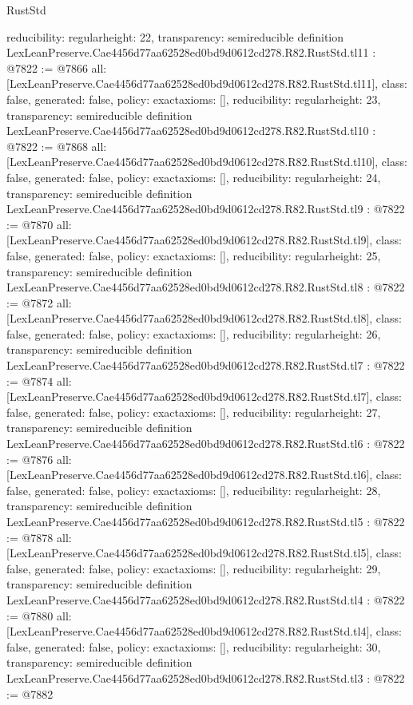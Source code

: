 \begin{lexlean}{RustStd}
\begin{coremodule}
{  reducibility: regular{height: 22},
  transparency: semireducible
}
definition LexLeanPreserve.Cae4456d77aa62528ed0bd9d0612cd278.R82.RustStd.tl11 : @7822 := @7866 {
  all: [LexLeanPreserve.Cae4456d77aa62528ed0bd9d0612cd278.R82.RustStd.tl11],
  class: false,
  generated: false,
  policy: exact{axioms: []},
  reducibility: regular{height: 23},
  transparency: semireducible
}
definition LexLeanPreserve.Cae4456d77aa62528ed0bd9d0612cd278.R82.RustStd.tl10 : @7822 := @7868 {
  all: [LexLeanPreserve.Cae4456d77aa62528ed0bd9d0612cd278.R82.RustStd.tl10],
  class: false,
  generated: false,
  policy: exact{axioms: []},
  reducibility: regular{height: 24},
  transparency: semireducible
}
definition LexLeanPreserve.Cae4456d77aa62528ed0bd9d0612cd278.R82.RustStd.tl9 : @7822 := @7870 {
  all: [LexLeanPreserve.Cae4456d77aa62528ed0bd9d0612cd278.R82.RustStd.tl9],
  class: false,
  generated: false,
  policy: exact{axioms: []},
  reducibility: regular{height: 25},
  transparency: semireducible
}
definition LexLeanPreserve.Cae4456d77aa62528ed0bd9d0612cd278.R82.RustStd.tl8 : @7822 := @7872 {
  all: [LexLeanPreserve.Cae4456d77aa62528ed0bd9d0612cd278.R82.RustStd.tl8],
  class: false,
  generated: false,
  policy: exact{axioms: []},
  reducibility: regular{height: 26},
  transparency: semireducible
}
definition LexLeanPreserve.Cae4456d77aa62528ed0bd9d0612cd278.R82.RustStd.tl7 : @7822 := @7874 {
  all: [LexLeanPreserve.Cae4456d77aa62528ed0bd9d0612cd278.R82.RustStd.tl7],
  class: false,
  generated: false,
  policy: exact{axioms: []},
  reducibility: regular{height: 27},
  transparency: semireducible
}
definition LexLeanPreserve.Cae4456d77aa62528ed0bd9d0612cd278.R82.RustStd.tl6 : @7822 := @7876 {
  all: [LexLeanPreserve.Cae4456d77aa62528ed0bd9d0612cd278.R82.RustStd.tl6],
  class: false,
  generated: false,
  policy: exact{axioms: []},
  reducibility: regular{height: 28},
  transparency: semireducible
}
definition LexLeanPreserve.Cae4456d77aa62528ed0bd9d0612cd278.R82.RustStd.tl5 : @7822 := @7878 {
  all: [LexLeanPreserve.Cae4456d77aa62528ed0bd9d0612cd278.R82.RustStd.tl5],
  class: false,
  generated: false,
  policy: exact{axioms: []},
  reducibility: regular{height: 29},
  transparency: semireducible
}
definition LexLeanPreserve.Cae4456d77aa62528ed0bd9d0612cd278.R82.RustStd.tl4 : @7822 := @7880 {
  all: [LexLeanPreserve.Cae4456d77aa62528ed0bd9d0612cd278.R82.RustStd.tl4],
  class: false,
  generated: false,
  policy: exact{axioms: []},
  reducibility: regular{height: 30},
  transparency: semireducible
}
definition LexLeanPreserve.Cae4456d77aa62528ed0bd9d0612cd278.R82.RustStd.tl3 : @7822 := @7882 {
}
\end{coremodule}
\end{lexlean}
